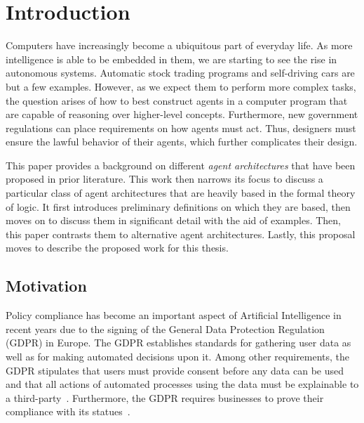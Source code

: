 \chapter{Introduction}

%
%

Computers have increasingly become a ubiquitous part of everyday life.
As more intelligence is able to be embedded in them, we are starting to see the rise in autonomous systems.
Automatic stock trading programs and self-driving cars are but a few examples.
However, as we expect them to perform more complex tasks, the question arises of how to best construct agents in a computer program that are capable of reasoning over higher-level concepts.
Furthermore, new government regulations can place requirements on how agents must act.
Thus, designers must ensure the lawful behavior of their agents, which further complicates their design.

This paper provides a background on different \textit{agent architectures} that have been proposed in prior literature.
This work then narrows its focus to discuss a particular class of agent architectures that are heavily based in the formal theory of logic.
It first introduces preliminary definitions on which they are based, then moves on to discuss them in significant detail with the aid of examples.
Then, this paper contrasts them to alternative agent architectures.
Lastly, this proposal moves to describe the proposed work for this thesis.

\section{Motivation}

Policy compliance has become an important aspect of Artificial Intelligence in recent years due to the signing of the General Data Protection Regulation (GDPR) in Europe.
The GDPR establishes standards for gathering user data as well as for making automated decisions upon it.
Among other requirements, the GDPR stipulates that users must provide consent before any data can be used and that all actions of automated processes using the data must be explainable to a third-party~\citep{sandra_wachter_artificial_2018}.
Furthermore, the GDPR requires businesses to prove their compliance with its statues~\citep{sandra_wachter_artificial_2018}.

